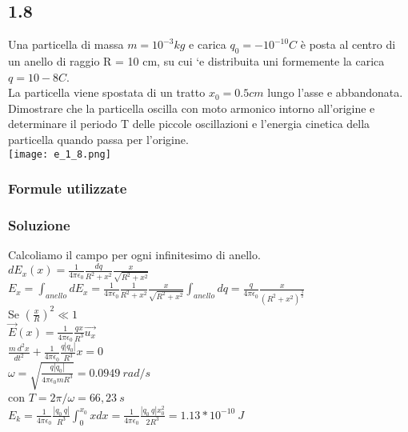 \documentclass[../../main.tex]{subfiles}
\begin{document}
\subsection*{1.8}
Una particella di massa $m = 10^{-3}kg$ e carica $q_0 = -10^{-10} C$ è posta al centro di un anello di raggio R = 10 cm, su cui `e distribuita uni formemente la carica $q = 10-8 C$.
\\La particella viene spostata di un tratto $x_0 = 0.5 cm$ lungo l’asse e abbandonata. 
\\Dimostrare che la particella oscilla con moto armonico intorno all’origine e determinare il periodo T delle piccole oscillazioni e l’energia cinetica della particella quando passa per l’origine.
\\\texttt{[image: e\_1\_8.png]}
\subsubsection*{Formule utilizzate}
\subsubsection*{Soluzione}
Calcoliamo il campo per ogni infinitesimo di anello.
\\$dE_x(x)=\frac{1}{4\pi\epsilon_0}\frac{dq}{R^2+x^2}\frac{x}{\sqrt{R^2 + x^2}}$
\\$E_x = \int_{anello}dE_x = \frac{1}{4\pi\epsilon_0}\frac{1}{R^2+x^2}\frac{x}{\sqrt{R^2+x^2}}\int_{anello}dq = \frac{q}{4\pi\epsilon_0}\frac{x}{(R^2 +x^2)^{\frac{3}{2}}}$
\\Se $\left(\frac{x}{R}\right)^2 \ll 1 $
\\$\vec{E}(x) = \frac{1}{4\pi\epsilon_0}\frac{qx}{R^3}\vec{u_x}$
\\$\frac{m\ d^2x}{dt^2}+\frac{1}{4\pi\epsilon_0}\frac{q|q_0|}{R^3}x = 0$
\\$\omega = \sqrt{\frac{q|q_0|}{4\pi\epsilon_0mR^3}} = 0.0949\ rad/s $
\\con $T = 2\pi / \omega = 66,23\ s$
\\$E_k = \frac{1}{4\pi\epsilon_0}\frac{|q_0\ q|}{R^3}\int_0^{x_0}xdx = \frac{1}{4\pi\epsilon_0}\frac{|q_0\ q| x_0^2}{2R^3}=1.13 * 10^{-10}\ J$
\newpage
\end{document}
